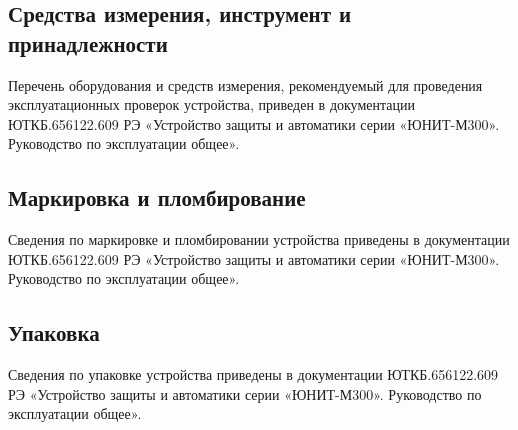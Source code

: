 \color{unidarkgreen}\subsection{Средства измерения, инструмент и принадлежности}\color{black}
Перечень оборудования и средств измерения, рекомендуемый для проведения эксплуатационных проверок устройства, приведен в документации ЮТКБ.656122.609 РЭ «Устройство защиты и автоматики серии «ЮНИТ-М300». Руководство по эксплуатации общее».

\color{unidarkgreen}\subsection{Маркировка и пломбирование}\color{black}
Сведения по маркировке и пломбировании устройства приведены в документации ЮТКБ.656122.609 РЭ «Устройство защиты и автоматики серии «ЮНИТ-М300». Руководство по эксплуатации общее».

\color{unidarkgreen}\subsection{Упаковка}\color{black}
Сведения по упаковке устройства приведены в документации ЮТКБ.656122.609 РЭ «Устройство защиты и автоматики серии «ЮНИТ-М300». Руководство по эксплуатации общее».
